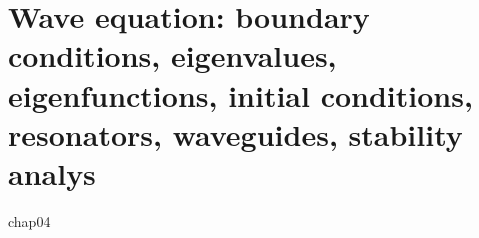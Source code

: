 \chapter{Wave equation: boundary conditions, eigenvalues, eigenfunctions, initial conditions, resonators, waveguides, stability analys}
chap04